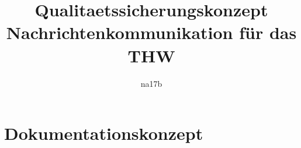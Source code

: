 \documentclass[a4paper,11pt,oneside, titlepage]{article}
\title{Qualitaetssicherungskonzept\\Nachrichtenkommunikation für das THW}
\author{na17b}
\date{}
\begin{document}
\maketitle


\tableofcontents


\newpage


\section{Dokumentationskonzept}






\end{document}
